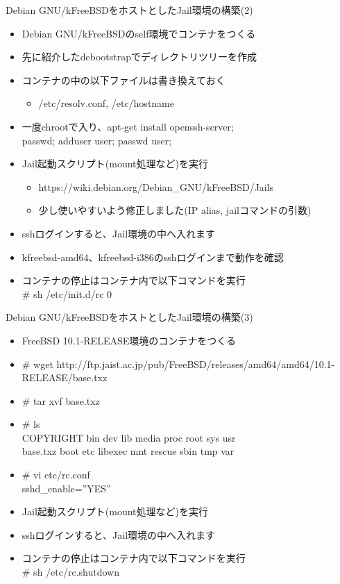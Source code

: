 \begin{frame}[containsverbatim]{Debian GNU/kFreeBSDをホストとしたJail環境の構築(2)}
  \begin{itemize}
    \item Debian GNU/kFreeBSDのself環境でコンテナをつくる
    \item 先に紹介したdebootstrapでディレクトリツリーを作成
    \item コンテナの中の以下ファイルは書き換えておく
    \begin{itemize}
      \item /etc/resolv.conf, /etc/hostname
    \end{itemize}
    \item 一度chrootで入り、apt-get install openssh-server; \\
passwd; adduser user; passwd user;
    \item Jail起動スクリプト(mount処理など)を実行
    \begin{itemize}
      \item https://wiki.debian.org/Debian\_GNU/kFreeBSD/Jails
      \item 少し使いやすいよう修正しました(IP alias, jailコマンドの引数)
    \end{itemize}
    \item sshログインすると、Jail環境の中へ入れます
    \item kfreebsd-amd64、kfreebsd-i386のsshログインまで動作を確認
    \item コンテナの停止はコンテナ内で以下コマンドを実行 \\
\# sh /etc/init.d/rc 0
  \end{itemize}
\end{frame}


\begin{frame}[containsverbatim]{Debian GNU/kFreeBSDをホストとしたJail環境の構築(3)}
  \begin{itemize}
    \item FreeBSD 10.1-RELEASE環境のコンテナをつくる
    \item \# wget http://ftp.jaist.ac.jp/pub/FreeBSD/releases/amd64/amd64/10.1-RELEASE/base.txz
    \item \# tar xvf base.txz
    \item \# ls \\
COPYRIGHT  bin   dev  lib      media  proc    root  sys  usr \\
base.txz   boot  etc  libexec  mnt    rescue  sbin  tmp  var \\
    \item \# vi etc/rc.conf \\
sshd\_enable=''YES''
    \item Jail起動スクリプト(mount処理など)を実行
    \item sshログインすると、Jail環境の中へ入れます
    \item コンテナの停止はコンテナ内で以下コマンドを実行 \\
\# sh /etc/rc.shutdown
  \end{itemize}
\end{frame}


